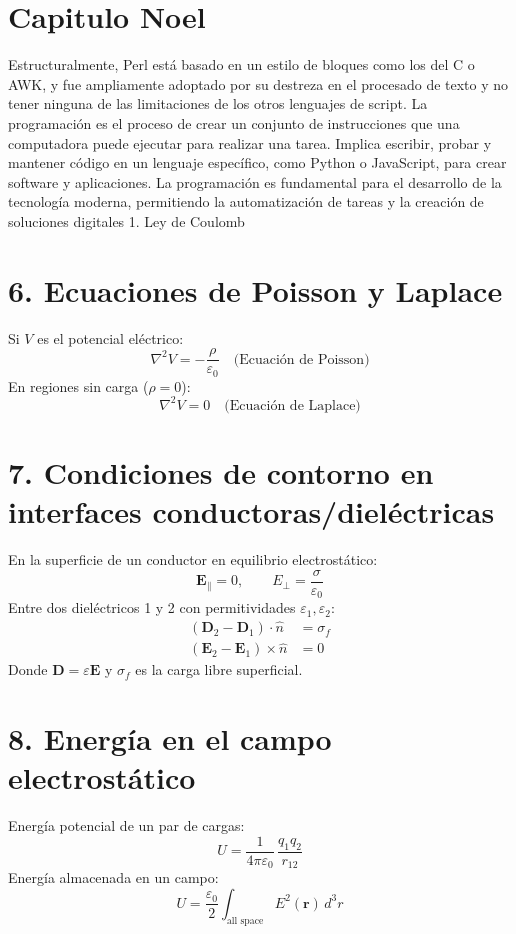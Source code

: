 \section{Capitulo Noel}    
Estructuralmente, Perl está basado en un estilo de bloques como los del C o AWK, y fue ampliamente adoptado por su destreza en el procesado de texto y no tener ninguna de las limitaciones de los otros lenguajes de script. La programación es el proceso de crear un conjunto de instrucciones que una computadora puede ejecutar para realizar una tarea. Implica escribir, probar y mantener código en un lenguaje específico, como Python o JavaScript, para crear software y aplicaciones. La programación es fundamental para el desarrollo de la tecnología moderna, permitiendo la automatización de tareas y la creación de soluciones digitales 
1. Ley de Coulomb
\section*{6. Ecuaciones de Poisson y Laplace}
Si $V$ es el potencial eléctrico:
\begin{equation}
\nabla^2 V=-\dfrac{\rho}{\varepsilon_0} \quad\text{(Ecuaci\'on de Poisson)}
\end{equation}
En regiones sin carga ($\rho=0$):
\begin{equation}
\nabla^2 V=0 \quad\text{(Ecuaci\'on de Laplace)}
\end{equation}


\section*{7. Condiciones de contorno en interfaces conductoras/diel\'ectricas}
En la superficie de un conductor en equilibrio electrost\'atico:
\begin{equation}
\mathbf{E}_{\parallel}=0, \qquad E_{\perp}=\dfrac{\sigma}{\varepsilon_0}
\end{equation}
Entre dos diel\'ectricos 1 y 2 con permitividades $\varepsilon_1,\varepsilon_2$:
\begin{align}
(\mathbf{D}_2-\mathbf{D}_1)\cdot\hat{n}&=\sigma_{f} \\
(\mathbf{E}_2-\mathbf{E}_1)\times\hat{n}&=0
\end{align}
Donde $\mathbf{D}=\varepsilon\mathbf{E}$ y $\sigma_f$ es la carga libre superficial.


\section*{8. Energ\'ia en el campo electrost\'atico}
Energ\'ia potencial de un par de cargas:
\begin{equation}
U=\dfrac{1}{4\pi\varepsilon_0}\,\dfrac{q_1 q_2}{r_{12}}
\end{equation}
Energ\'ia almacenada en un campo:
\begin{equation}
U=\dfrac{\varepsilon_0}{2}\int_{\text{all space}} E^2(\mathbf{r})\, d^3r
\end{equation}


